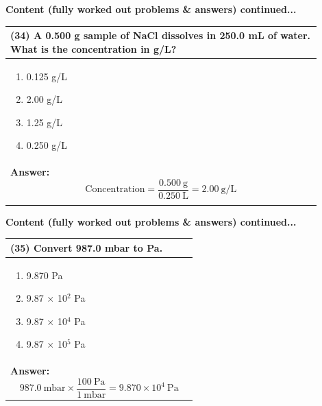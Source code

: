 \documentclass{article}
\begin{document}
\newpage
\noindent
{\large\textbf{Content (fully worked out problems \& answers) continued...}}\\
\vspace{0.2cm}
\begin{tabular}{|p{0.9\linewidth}|}
\hline
\vspace{0.2cm}
\textbf{(34)} A 0.500 g sample of NaCl dissolves in 250.0 mL of water. What is the concentration in g/L?\\
\hline
\vspace{0.2cm}
\begin{minipage}[t]{0.85\linewidth}
\begin{enumerate}[label=\alph*.]
\item 0.125 g/L
\item 2.00 g/L
\item 1.25 g/L
\item 0.250 g/L
\end{enumerate}
\end{minipage} \\
\hline
\vspace{0.2cm}
\textbf{Answer:} 
\[
\text{Concentration} = \frac{0.500~\text{g}}{0.250~\text{L}} = 2.00~\text{g/L}
\] \\
\\
\hline
\end{tabular}

\newpage
\noindent
{\large\textbf{Content (fully worked out problems \& answers) continued...}}\\[0.2em]
\vspace{0.2cm}
\begin{tabular}{|p{0.9\linewidth}|}
\hline
\vspace{0.2cm}
\textbf{(35)} Convert 987.0 mbar to Pa.\\
\hline
\vspace{0.2cm}
\begin{minipage}[t]{0.85\linewidth}
\begin{enumerate}[label=\alph*.]
\item 9.870 Pa
\item 9.87 $\times$ 10$^2$ Pa
\item 9.87 $\times$ 10$^4$ Pa
\item 9.87 $\times$ 10$^5$ Pa
\end{enumerate}
\end{minipage} \\
\hline
\vspace{0.2cm}
\textbf{Answer:} 
\[
987.0~\text{mbar} \times \frac{100~\text{Pa}}{1~\text{mbar}} = 9.870 \times 10^4~\text{Pa}
\] \\ 
\hline
\end{tabular}
\end{document}
